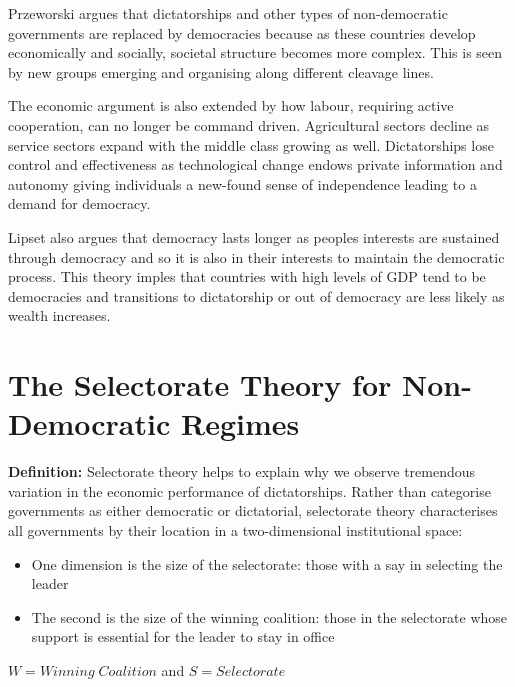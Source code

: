 \documentclass[12pt, letterpaper]{article}
\begin{document}
Przeworski argues that dictatorships and other types of non-democratic governments are replaced by democracies because as these countries develop economically and socially, societal structure becomes more complex. This is seen by new groups emerging and organising along different cleavage lines.

The economic argument is also extended by how labour, requiring active cooperation, can no longer be command driven. Agricultural sectors decline as service sectors expand with the middle class growing as well. Dictatorships lose control and effectiveness as technological change endows private information and autonomy giving individuals a new-found sense of independence leading to a demand for democracy.

Lipset also argues that democracy lasts longer as peoples interests are sustained through democracy and so it is also in their interests to maintain the democratic process. This theory imples that countries with high levels of GDP tend to be democracies and transitions to dictatorship or out of democracy are less likely as wealth increases.

\newpage
\section{The Selectorate Theory for Non-Democratic Regimes}

\textbf{Definition:} Selectorate theory helps to explain why we observe tremendous variation in the economic performance of dictatorships. Rather than categorise governments as either democratic or dictatorial, selectorate theory characterises all governments by their location in a two-dimensional institutional space:
\begin{itemize}
	\item One dimension is the size of the selectorate: those with a say in selecting the leader
	\item The second is the size of the winning coalition: those in the selectorate whose support is essential for the leader to stay in office
\end{itemize}

\begin{center}
	$W = Winning\;Coalition$ and $S = Selectorate$
\end{center}
\end{document}
